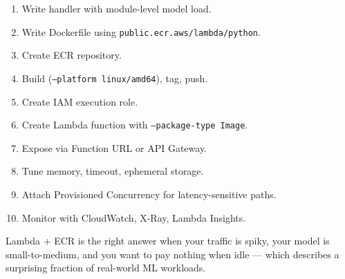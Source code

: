 \documentclass[11pt,a4paper]{article}
\begin{document}
\begin{enumerate}[leftmargin=*,nosep]
    \item Write handler with module-level model load.
    \item Write Dockerfile using \texttt{public.ecr.aws/lambda/python}.
    \item Create ECR repository.
    \item Build (\texttt{--platform linux/amd64}), tag, push.
    \item Create IAM execution role.
    \item Create Lambda function with \texttt{--package-type Image}.
    \item Expose via Function URL or API Gateway.
    \item Tune memory, timeout, ephemeral storage.
    \item Attach Provisioned Concurrency for latency-sensitive paths.
    \item Monitor with CloudWatch, X-Ray, Lambda Insights.
\end{enumerate}

Lambda + ECR is the right answer when your traffic is spiky, your model is
small-to-medium, and you want to pay nothing when idle --- which describes a
surprising fraction of real-world ML workloads.
\end{document}
